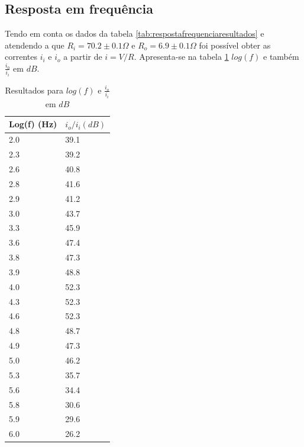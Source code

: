 \documentclass[%
  reprint,
  nofootinbib,
  amsmath,amssymb,
  aps,
  10pt,
  a4paper
]{revtex4-1}
\begin{document}
\subsection{Resposta em frequência}
Tendo em conta os dados da tabela \ref{tab:respostafrequenciaresultados} e atendendo a que $R_i=70.2 \pm 0.1\Omega$ e $R_o=6.9 \pm 0.1\Omega$ foi possível obter as correntes $i_i$ e $i_o$ a partir de $i=V/R$. Apresenta-se na tabela \ref{tab:respostafrequenciaanalise} $log(f)$ e também $\frac{i_0}{i_i}$ em $dB$. 


\begin{table}
    \begin{tabular}{|l|l|}
    \hline
    Log(f) (Hz) & $ i_o/i_i (dB)$ \\ \hline
    2.0         & 39.1           \\ \hline
    2.3         & 39.2           \\ \hline
    2.6         & 40.8           \\ \hline
    2.8         & 41.6           \\ \hline
    2.9         & 41.2           \\ \hline
    3.0         & 43.7           \\ \hline
    3.3         & 45.9           \\ \hline
    3.6         & 47.4           \\ \hline
    3.8         & 47.3           \\ \hline
    3.9         & 48.8           \\ \hline
    4.0         & 52.3           \\ \hline
    4.3         & 52.3           \\ \hline
    4.6         & 52.3           \\ \hline
    4.8         & 48.7           \\ \hline
    4.9         & 47.3           \\ \hline
    5.0         & 46.2           \\ \hline
    5.3         & 35.7           \\ \hline
    5.6         & 34.4           \\ \hline
    5.8         & 30.6           \\ \hline
    5.9         & 29.6           \\ \hline
    6.0         & 26.2           \\ \hline
    \end{tabular}
\caption{Resultados para $log(f)$ e $\frac{i_o}{i_i}$ em $dB$}
\label{tab:respostafrequenciaanalise}
\end{table}
\end{document}
